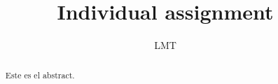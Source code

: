 \documentclass{article}
\begin{document}
\renewcommand{\footrulewidth}{1pt}
\renewcommand{\tablename}{Tabla}
\author{}%
\title{Individual assignment}
\date{LMT}%
\maketitle
\begin{abstract}
Este es el abstract.              
\end{abstract}
\end{document}
